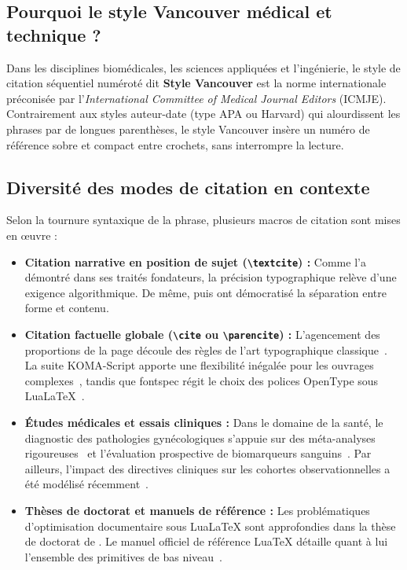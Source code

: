 \subsection{Pourquoi le style Vancouver médical et technique ?}
\label{subsec:pourquoi_vancouver}

Dans les disciplines biomédicales, les sciences appliquées et l'ingénierie, le style de citation séquentiel numéroté dit \textbf{Style Vancouver} est la norme internationale préconisée par l'\emph{International Committee of Medical Journal Editors} (ICMJE).
Contrairement aux styles auteur-date (type APA ou Harvard) qui alourdissent les phrases par de longues parenthèses, le style Vancouver insère un numéro de référence sobre et compact entre crochets, sans interrompre la lecture.

\subsection{Diversité des modes de citation en contexte}
\label{subsec:modes_citations_contexte}

Selon la tournure syntaxique de la phrase, plusieurs macros de citation sont mises en œuvre :

\begin{itemize}
  \item \textbf{Citation narrative en position de sujet (\texttt{\textbackslash textcite}) :}
  Comme l'a démontré \textcite{knuth1984texbook} dans ses traités fondateurs, la précision typographique relève d'une exigence algorithmique.
  De même, \textcite{lamport1994latex} puis \textcite{mittelbach2004companion} ont démocratisé la séparation entre forme et contenu.
  
  \item \textbf{Citation factuelle globale (\texttt{\textbackslash cite} ou \texttt{\textbackslash parencite}) :}
  L'agencement des proportions de la page découle des règles de l'art typographique classique~\cite{bringhurst2004elements}.
  La suite KOMA-Script apporte une flexibilité inégalée pour les ouvrages complexes~\cite{kohm2024koma},
  tandis que \textsf{fontspec} régit le choix des polices OpenType sous Lua\LaTeX{}~\cite{robertson2020fontspec}.
  
  \item \textbf{Études médicales et essais cliniques :}
  Dans le domaine de la santé, le diagnostic des pathologies gynécologiques s'appuie sur des méta-analyses rigoureuses~\cite{kanti2024ultrasound} et l'évaluation prospective de biomarqueurs sanguins~\cite{burghaus2024}.
  Par ailleurs, l'impact des directives cliniques sur les cohortes observationnelles a été modélisé récemment~\cite{nieva2024impact}.

  \item \textbf{Thèses de doctorat et manuels de référence :}
  Les problématiques d'optimisation documentaire sous Lua\LaTeX{} sont approfondies dans la thèse de doctorat de \textcite{winant2026thesis}.
  Le manuel officiel de référence Lua\TeX{} détaille quant à lui l'ensemble des primitives de bas niveau~\cite{luatex2024manual}.
\end{itemize}

